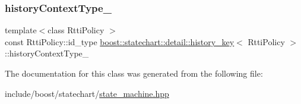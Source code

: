 \subsubsection{\texorpdfstring{history\+Context\+Type\+\_\+}{historyContextType\_}}
{\footnotesize\ttfamily template$<$class Rtti\+Policy $>$ \\
const Rtti\+Policy\+::id\+\_\+type \mbox{\hyperlink{classboost_1_1statechart_1_1detail_1_1history__key}{boost\+::statechart\+::detail\+::history\+\_\+key}}$<$ Rtti\+Policy $>$\+::history\+Context\+Type\+\_\+\hspace{0.3cm}{\ttfamily [private]}}



The documentation for this class was generated from the following file\+:\begin{DoxyCompactItemize}
\item 
include/boost/statechart/\mbox{\hyperlink{state__machine_8hpp}{state\+\_\+machine.\+hpp}}\end{DoxyCompactItemize}
